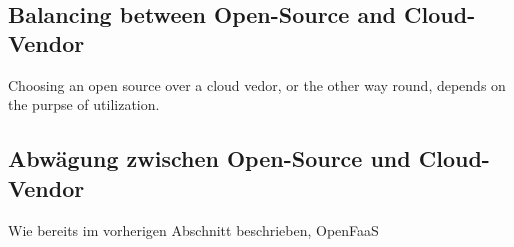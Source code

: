 \documentclass[11pt]{article}
\begin{document}
\cite{van2019spec}
\cite{Yussupov2019_SystematicMappingStudyFaaS}
\cite{lee2018evaluation}
\cite{aws2020ManagingFunctions}
\\\\


\subsection{Balancing between Open-Source and Cloud-Vendor}
Choosing an open source over a cloud vedor, or the other way round, depends on the purpse of utilization. 
\subsection{Abwägung zwischen Open-Source und Cloud-Vendor}

Wie bereits im vorherigen Abschnitt beschrieben, 
OpenFaaS  
\end{document}
